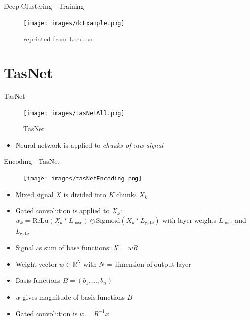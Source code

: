 \documentclass[xcolor=table,mathserif,9pt]{beamer}    %
\begin{document}
\begin{frame}{Deep Clustering - Training}
	
\begin{figure}[htpb]
	\centering
	\texttt{[image: images/dcExample.png]}
	\caption{reprinted from Lensson}
\end{figure}

\end{frame}

\section{TasNet}%
\label{sec:tasnet}
\begin{frame}{TasNet \cite{TasNet2017}}

\begin{figure}[htpb]
	\centering
	\texttt{[image: images/tasNetAll.png]}
	\caption{TasNet}
\end{figure}
\vspace{10mm}
\begin{itemize}
	\item Neural network is applied to \emph{chunks of raw signal}
\end{itemize}

\end{frame}

\begin{frame}{Encoding - TasNet}

\begin{minipage}[t]{0.48\linewidth}
	\begin{figure}[htpb]
		\centering
		\texttt{[image: images/tasNetEncoding.png]}
	\end{figure}
\end{minipage}%
\hfill%
\begin{minipage}[t]{0.48\linewidth}
	\begin{itemize}
		\item Mixed signal $X$ is divided into $K$ chunks $X_k$ 
		\item Gated convolution is applied to $X_k$: 
			\emph{$w_k = \text{ReLu}(X_k * L_{\text{base}}) \odot \text{Sigmoid}(X_k * L_{\text{gate}})$} with layer weights $L_{\text{base}}$ and $L_{\text{gate}}$
	\end{itemize}
	\vspace{5mm}
	\begin{itemize}
		\item Signal as sum of base functions: $X = wB$
		\item Weight vector $w \in \mathbb{R}^{N}$ with $N$ = 
		      dimension of output layer
		\item Basis functions $B = (b_1, ...,b_n)$ 
		\item $w$ gives magnitude of basis functions $B$
		\item Gated convolution is \emph{$w = B^{-1}x$}
	\end{itemize}
\end{minipage}	



\end{frame}
\end{document}
